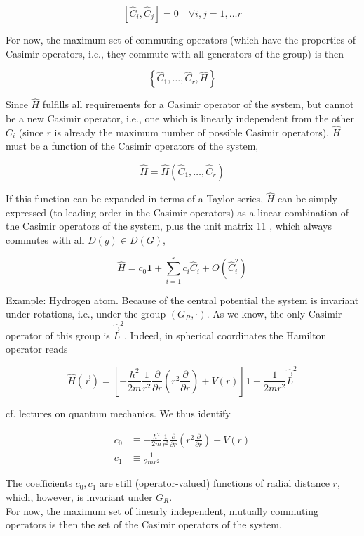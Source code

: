\documentclass[10pt, letterpaper]{article}
\begin{document}
$$
\left[\hat{C}_{i}, \hat{C}_{j}\right]=0 \quad \forall i, j=1, \ldots r
$$

For now, the maximum set of commuting operators (which have the properties of Casimir operators, i.e., they commute with all generators of the group) is then

$$
\left\{\hat{C}_{1}, \ldots, \hat{C}_{r}, \hat{H}\right\}
$$

Since $\hat{H}$ fulfills all requirements for a Casimir operator of the system, but cannot be a new Casimir operator, i.e., one which is linearly independent from the other $\hat{C}_{i}$ (since $r$ is already the maximum number of possible Casimir operators), $\hat{H}$ must be a function of the Casimir operators of the system,

$$
\hat{H}=\hat{H}\left(\hat{C}_{1}, \ldots, \hat{C}_{r}\right)
$$

If this function can be expanded in terms of a Taylor series, $\hat{H}$ can be simply expressed (to leading order in the Casimir operators) as a linear combination of the Casimir operators of the system, plus the unit matrix 11 , which always commutes with all $D(g) \in D(G)$,

$$
\hat{H}=c_{0} \mathbf{1}+\sum_{i=1}^{r} c_{i} \hat{C}_{i}+O\left(\hat{C}_{i}^{2}\right)
$$

Example: Hydrogen atom. Because of the central potential the system is invariant under rotations, i.e., under the group $\left(G_{R}, \cdot\right)$. As we know, the only Casimir operator of this group is $\hat{\vec{L}}^{2}$. Indeed, in spherical coordinates the Hamilton operator reads

$$
\hat{H}(\vec{r})=\left[-\frac{\hbar^{2}}{2 m} \frac{1}{r^{2}} \frac{\partial}{\partial r}\left(r^{2} \frac{\partial}{\partial r}\right)+V(r)\right] \mathbf{1}+\frac{1}{2 m r^{2}} \hat{\vec{L}}^{2}
$$

cf. lectures on quantum mechanics. We thus identify

$$
\begin{aligned}
c_{0} & \equiv-\frac{\hbar^{2}}{2 m} \frac{1}{r^{2}} \frac{\partial}{\partial r}\left(r^{2} \frac{\partial}{\partial r}\right)+V(r) \\
c_{1} & \equiv \frac{1}{2 m r^{2}}
\end{aligned}
$$

The coefficients $c_{0}, c_{1}$ are still (operator-valued) functions of radial distance $r$, which, however, is invariant under $G_{R}$.\\
For now, the maximum set of linearly independent, mutually commuting operators is then the set of the Casimir operators of the system,
\end{document}
